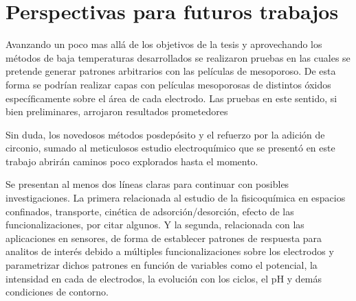 \section*{Perspectivas para futuros trabajos}


Avanzando un poco mas allá de los objetivos de la tesis y aprovechando los métodos de baja temperaturas desarrollados se realizaron pruebas en las cuales se pretende generar patrones arbitrarios con las películas de mesoporoso. De esta forma se podrían realizar capas con películas mesoporosas de distintos óxidos específicamente sobre el área de cada electrodo. Las pruebas en este sentido, si bien preliminares, arrojaron resultados prometedores

Sin duda, los novedosos métodos posdepósito y el refuerzo por la adición de circonio, sumado al meticulosos estudio electroquímico que se presentó en este trabajo abrirán caminos poco explorados hasta el momento.

Se presentan al menos dos líneas claras para continuar con posibles investigaciones. La primera relacionada al estudio de la fisicoquímica en espacios confinados, transporte, cinética de adsorción/desorción, efecto de las funcionalizaciones, por citar algunos. Y la segunda, relacionada con las aplicaciones en sensores, de forma de establecer patrones de respuesta para analitos de interés debido a múltiples funcionalizaciones sobre los electrodos y parametrizar dichos patrones en función de variables como el potencial, la intensidad en cada de electrodos, la evolución con los ciclos, el pH y demás condiciones de contorno.




























